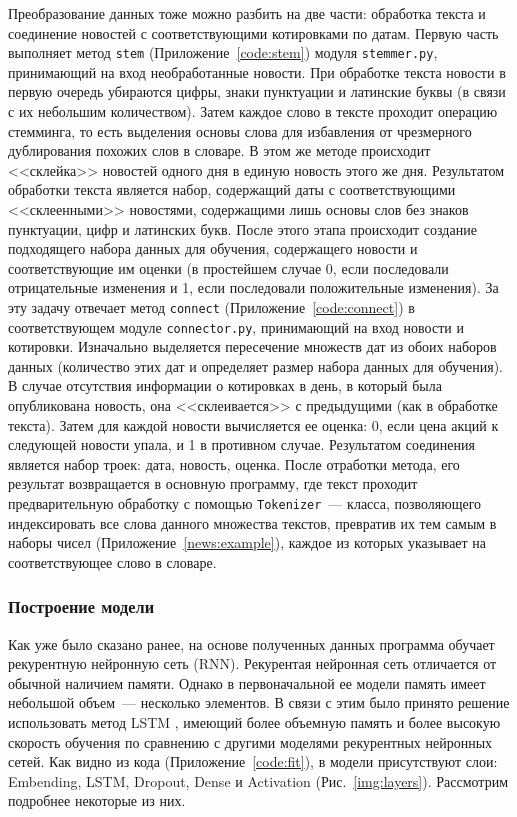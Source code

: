 \documentclass[14pt]{matmex-diploma-custom}
\begin{document}
Преобразование данных тоже можно разбить на две части: обработка текста и соединение новостей с соответствующими котировками по датам. Первую часть выполняет метод \texttt{stem} (Приложение~\ref{code:stem}) модуля \texttt{stemmer.py}, принимающий на вход необработанные новости. При обработке текста новости в первую очередь убираются цифры, знаки пунктуации и латинские буквы (в связи с их небольшим количеством). Затем каждое слово в тексте проходит операцию стемминга, то есть выделения основы слова для избавления от чрезмерного дублирования похожих слов в словаре. В этом же методе происходит <<склейка>> новостей одного дня в единую новость этого же дня. Результатом обработки текста является набор, содержащий даты с соответствующими <<склеенными>> новостями, содержащими лишь основы слов без знаков пунктуации, цифр и латинских букв. После этого этапа происходит создание подходящего набора данных для обучения, содержащего новости и соответствующие им оценки (в простейшем случае 0, если последовали отрицательные изменения и 1, если последовали положительные изменения). За эту задачу отвечает метод \texttt{connect} (Приложение~\ref{code:connect}) в соответствующем модуле \texttt{connector.py}, принимающий на вход новости и котировки. Изначально выделяется пересечение множеств дат из обоих наборов данных (количество этих дат и определяет размер набора данных для обучения). В случае отсутствия информации о котировках в день, в который была опубликована новость, она <<склеивается>> с предыдущими (как в обработке текста). Затем для каждой новости вычисляется ее оценка: 0, если цена акций к следующей новости упала, и 1 в противном случае. Результатом соединения является набор троек: дата, новость, оценка. После отработки метода, его результат возвращается в основную программу, где текст проходит предварительную обработку с помощью \texttt{Tokenizer}~--- класса, позволяющего индексировать все слова данного множества текстов, превратив их тем самым в наборы чисел (Приложение~\ref{news:example}), каждое из которых указывает на соответствующее слово в словаре.

\subsubsection{Построение модели}

Как уже было сказано ранее, на основе полученных данных программа обучает рекурентную нейронную сеть (RNN). Рекурентая нейронная сеть отличается от обычной наличием памяти. Однако в первоначальной ее модели память имеет небольшой объем~--- несколько элементов. В связи с этим было принято решение использовать метод LSTM \cite{tools:lstm}, имеющий более объемную память и более высокую скорость обучения по сравнению с другими моделями рекурентных нейронных сетей. Как видно из кода (Приложение~\ref{code:fit}), в модели присутствуют слои: Embending, LSTM, Dropout, Dense и Activation (Рис.~\ref{img:layers}). Рассмотрим подробнее некоторые из них.
\end{document}
